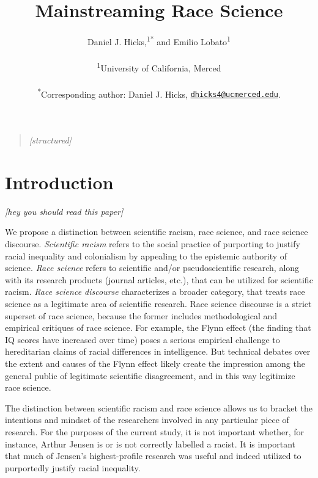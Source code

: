 \documentclass[12pt]{article}
\title{\bf Mainstreaming Race Science}
\author{
Daniel J. Hicks,\textsuperscript{1}\textsuperscript{*}
and Emilio Lobato\textsuperscript{1}
\\
\\
\normalsize{\textsuperscript{1}University of California, Merced}\\
\\
\textsuperscript{*}Corresponding author: Daniel J. Hicks, \href{mailto:dhicks4@ucmerced.edu}{\nolinkurl{dhicks4@ucmerced.edu}}.
}
\date{}
\newenvironment{sciabstract}{%
\begin{quote} \singlespacing}
{\end{quote}}
\begin{document}

\baselineskip24pt


\maketitle


\begin{sciabstract}
\emph{{[}structured{]}}
\end{sciabstract}

\hypertarget{introduction}{%
\section*{Introduction}\label{introduction}}

\emph{{[}hey you should read this paper{]}}

We propose a distinction between scientific racism, race science, and race science discourse. \emph{Scientific racism} refers to the social practice of purporting to justify racial inequality and colonialism by appealing to the epistemic authority of science. \emph{Race science} refers to scientific and/or pseudoscientific research, along with its research products (journal articles, etc.), that can be utilized for scientific racism. \emph{Race science discourse} characterizes a broader category, that treats race science as a legitimate area of scientific research. Race science discourse is a strict superset of race science, because the former includes methodological and empirical critiques of race science. For example, the Flynn effect (the finding that IQ scores have increased over time) poses a serious empirical challenge to hereditarian claims of racial differences in intelligence. But technical debates over the extent and causes of the Flynn effect likely create the impression among the general public of legitimate scientific disagreement, and in this way legitimize race science.

The distinction between scientific racism and race science allows us to bracket the intentions and mindset of the researchers involved in any particular piece of research. For the purposes of the current study, it is not important whether, for instance, Arthur Jensen is or is not correctly labelled a racist. It is important that much of Jensen's highest-profile research was useful and indeed utilized to purportedly justify racial inequality.
\end{document}

